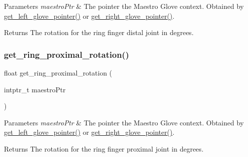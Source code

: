 \begin{DoxyParams}{Parameters}
{\em maestro\+Ptr} & The pointer the Maestro Glove context. Obtained by \hyperlink{group__glove_management_ga63ce3c99d4a8b8db851b22af9185764e}{get\+\_\+left\+\_\+glove\+\_\+pointer()} or \hyperlink{group__glove_management_ga9b8fd9d91aeac3f8da50f7a7eba0c32b}{get\+\_\+right\+\_\+glove\+\_\+pointer()}. \\
\hline
\end{DoxyParams}
\begin{DoxyReturn}{Returns}
The rotation for the ring finger distal joint in degrees. 
\end{DoxyReturn}
\mbox{\label{group__rotation_access_ga2941894deaa99df80b74f33c824bbb07}} 
\subsubsection{\texorpdfstring{get\+\_\+ring\+\_\+proximal\+\_\+rotation()}{get\_ring\_proximal\_rotation()}}
{\footnotesize\ttfamily float get\+\_\+ring\+\_\+proximal\+\_\+rotation (\begin{DoxyParamCaption}\item[{intptr\+\_\+t}]{maestro\+Ptr }\end{DoxyParamCaption})}


\begin{DoxyParams}{Parameters}
{\em maestro\+Ptr} & The pointer the Maestro Glove context. Obtained by \hyperlink{group__glove_management_ga63ce3c99d4a8b8db851b22af9185764e}{get\+\_\+left\+\_\+glove\+\_\+pointer()} or \hyperlink{group__glove_management_ga9b8fd9d91aeac3f8da50f7a7eba0c32b}{get\+\_\+right\+\_\+glove\+\_\+pointer()}. \\
\hline
\end{DoxyParams}
\begin{DoxyReturn}{Returns}
The rotation for the ring finger proximal joint in degrees. 
\end{DoxyReturn}
\mbox{\label{group__rotation_access_gaf6dfb65e74ed572e79a082d42e53157f}} 
